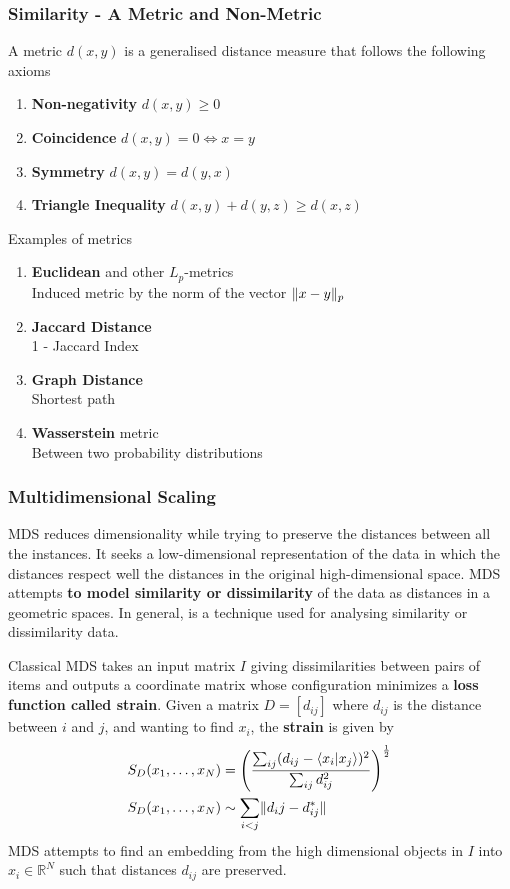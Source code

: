 \documentclass[11pt]{article}
\theoremstyle{definition}
\newcommand*\R{\mathbb{R}}
\DeclarePairedDelimiter\norm{\lVert}{\rVert}
\begin{document}
\subsubsection{Similarity - A Metric and Non-Metric}
A metric $d(x,y)$ is a generalised distance measure that follows the following axioms
\begin{enumerate}
	\item \textbf{Non-negativity} $ d(x,y) \geq 0 $
	\item \textbf{Coincidence} $ d(x,y) = 0 \Leftrightarrow x = y $
	\item \textbf{Symmetry} $ d(x,y) = d(y,x) $
	\item \textbf{Triangle Inequality} $ d(x,y) + d(y,z) \geq d(x,z) $
\end{enumerate}

\vspace{1em}
\noindent
Examples of metrics
\begin{enumerate}[label=\alph*]
	\item \textbf{Euclidean} and other $L_p$-metrics\\
	Induced metric by the norm of the vector $\norm{x-y}_p$
	\item \textbf{Jaccard Distance}\\
	1 - Jaccard Index
	\item \textbf{Graph Distance}\\
	Shortest path
	\item \textbf{Wasserstein} metric\\
	Between two probability distributions
\end{enumerate}

\subsubsection{Multidimensional Scaling}
MDS reduces dimensionality while trying to preserve the distances between all the instances. It seeks a low-dimensional representation of the data in which the distances respect well the distances in the original high-dimensional space. MDS attempts \textbf{to model similarity or dissimilarity} of the data as distances in a geometric spaces. In general, is a technique used for analysing similarity or dissimilarity data.

Classical MDS takes an input matrix $I$ giving dissimilarities between pairs of items and outputs a coordinate matrix whose configuration minimizes a \textbf{loss function called strain}. Given a matrix $D = [d_{ij}]$ where $d_{ij}$ is the distance between $i$ and $j$, and wanting to find $x_i$, the \textbf{strain} is given by
\begin{align*}
	S_D(x_1,\dots,x_N) &= \left(\frac{\sum_{ij}(d_{ij} - \langle x_i|x_j\rangle)^2}{\sum_{ij}d_{ij}^2}\right)^{\frac{1}{2}}\\
	S_D(x_1,\dots,x_N) &\sim \sum_{i<j}\norm{d_ij - d_{ij}^*}
\end{align*}
MDS attempts to find an embedding from the high dimensional objects in $I$ into $x_i\in\R^N$ such that distances $d_{ij}$ are preserved.
\end{document}
